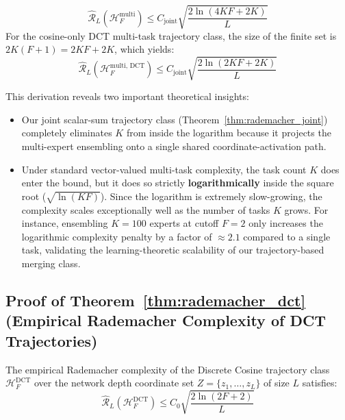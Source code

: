 \begin{equation}
    \widehat{\mathcal{R}}_L(\boldsymbol{\mathcal{H}}_F^{\text{multi}}) \le C_{\text{joint}} \sqrt{\frac{2 \ln(4KF+2K)}{L}}
\end{equation}
For the cosine-only DCT multi-task trajectory class, the size of the finite set is $2K(F+1) = 2KF+2K$, which yields:
\begin{equation}
    \widehat{\mathcal{R}}_L(\boldsymbol{\mathcal{H}}_F^{\text{multi, DCT}}) \le C_{\text{joint}} \sqrt{\frac{2 \ln(2KF+2K)}{L}}
\end{equation}

This derivation reveals two important theoretical insights:
\begin{itemize}
    \item Our joint scalar-sum trajectory class (Theorem~\ref{thm:rademacher_joint}) completely eliminates $K$ from inside the logarithm because it projects the multi-expert ensembling onto a single shared coordinate-activation path.
    \item Under standard vector-valued multi-task complexity, the task count $K$ does enter the bound, but it does so strictly \textbf{logarithmically} inside the square root ($\sqrt{\ln(KF)}$). Since the logarithm is extremely slow-growing, the complexity scales exceptionally well as the number of tasks $K$ grows. For instance, ensembling $K=100$ experts at cutoff $F=2$ only increases the logarithmic complexity penalty by a factor of $\approx 2.1$ compared to a single task, validating the learning-theoretic scalability of our trajectory-based merging class.
\end{itemize}


\subsection{Proof of Theorem~\ref{thm:rademacher_dct} (Empirical Rademacher Complexity of DCT Trajectories)}
\label{proof:thm_rademacher_dct}

\begin{theorem}
The empirical Rademacher complexity of the Discrete Cosine trajectory class $\mathcal{H}_F^{\text{DCT}}$ over the network depth coordinate set $Z = \{z_1, \dots, z_L\}$ of size $L$ satisfies:
\begin{equation}
    \widehat{\mathcal{R}}_L(\mathcal{H}_F^{\text{DCT}}) \le C_0 \sqrt{\frac{2 \ln(2F+2)}{L}}
\end{equation}
\end{theorem}


